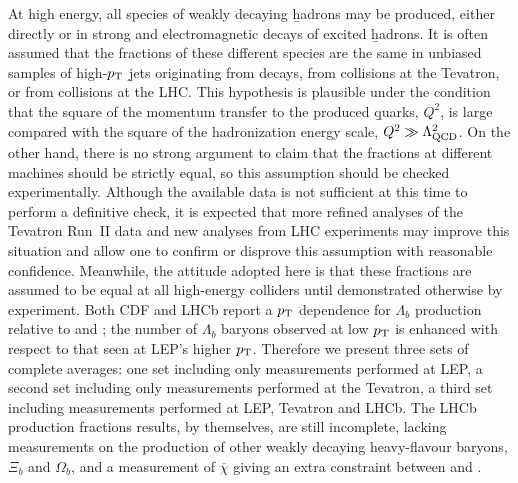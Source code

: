 
At high energy, all species of weakly decaying \b hadrons 
may be produced, either directly or in strong and electromagnetic 
decays of excited \b hadrons. It is often assumed that the fractions 
of these different species are the same in unbiased samples of 
high-$p_{\rm T}$ \b jets originating from  decays, 
from  collisions at the Tevatron, or from 
 collisions at the LHC.
This hypothesis is plausible under the condition that the square of
the momentum transfer to the produced \b quarks, $Q^2$, is large compared 
with the square of the hadronization energy scale, 
$Q^2 \gg \Lambda_{\rm QCD}^2$.
On the other hand, there is no strong argument to claim that the
fractions at different machines should be strictly equal, so 
this assumption should be checked experimentally. Although the 
available data is not sufficient at this time to perform a definitive
check, it is expected that more refined analyses of the Tevatron Run~II data 
and new analyses from LHC 
experiments may improve this situation and allow one to confirm or 
disprove this assumption with reasonable confidence. Meanwhile, the 
attitude adopted here is that these fractions are assumed to be equal 
at all high-energy colliders until demonstrated otherwise by 
experiment.
Both CDF and LHCb report a $p_{\rm T}$ dependence for $\Lambda_b$
production relative to \Bu and \Bd; the number of $\Lambda_b$ baryons
observed at low $p_{\rm T}$ is enhanced with respect to that 
seen at LEP's higher $p_{\rm T}$.
Therefore we present 
three sets of complete averages: one set including only measurements 
performed at LEP, a second set including only measurements performed 
at the Tevatron, a third  set including measurements performed at LEP, 
Tevatron and LHCb.  The LHCb production fractions results, by themselves, 
are still incomplete, lacking measurements on the production of other
weakly decaying heavy-flavour baryons, $\Xi_b$ and $\Omega_b$, and a measurement of 
$\overline{\chi}$ giving an extra constraint between \fBd and \fBs.

